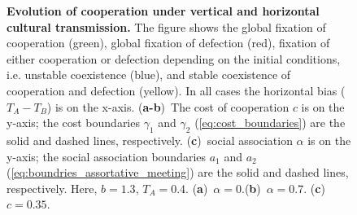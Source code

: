 \documentclass[12pt]{extarticle}
\begin{document}
{\begin{figure}[h]
    \caption{\textbf{Evolution of cooperation under vertical and horizontal cultural transmission.} 
The figure shows the global fixation of cooperation (green), global fixation of defection (red), fixation of either cooperation or defection depending on the initial conditions, i.e. unstable coexistence (blue), and stable coexistence of cooperation and defection (yellow).
In all cases the horizontal bias ($T_A-T_B$) is on the x-axis.
(\textbf{a-b})~The cost of cooperation $c$ is on the y-axis; the cost boundaries $\gamma_1$ and $\gamma_2$ (\autoref{eq:cost_boundaries}) are the solid and dashed lines, respectively. 
(\textbf{c})~social association $\alpha$ is on the y-axis; the social association boundaries $a_1$ and $a_2$ (\autoref{eq:boundries_assortative_meeting}) are the solid and dashed lines, respectively.
Here, $b=1.3$, $T_A=0.4$. (\textbf{a})~$\alpha = 0$.(\textbf{b})~$\alpha = 0.7$. (\textbf{c})~$c = 0.35$.
  	}
    \label{fig:result2}
\end{figure}




}
\end{document}
